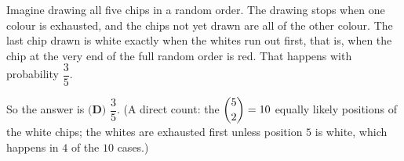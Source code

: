 Imagine drawing all five chips in a random order. The drawing stops when one colour is exhausted, and the chips not yet drawn are all of the other colour. The last chip drawn is white exactly when the whites run out first, that is, when the chip at the very end of the full random order is red. That happens with probability $\dfrac{3}{5}$.

So the answer is $\boxed{\textbf{(D) } \dfrac{3}{5}}$. (A direct count: the $\dbinom52=10$ equally likely positions of the white chips; the whites are exhausted first unless position $5$ is white, which happens in $4$ of the $10$ cases.)
